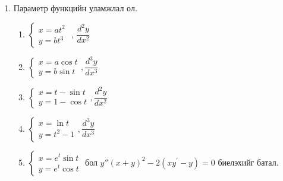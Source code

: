 \begin{enumerate}
\begin{enumerate}
    \item $e^{x+y}-xy=0$ , $y''$
\end{enumerate}
\item Параметр функцийн уламжлал ол.
\begin{enumerate}
    \item
    $\begin{cases}
        x=at^2\\
        y=bt^3
    \end{cases}$ , $\dfrac{d^2y}{dx^2}$
      \item 
     $ \begin{cases}
        x=a\cos t\\
        y=b\sin t
    \end{cases} , \dfrac{d^3y}{dx^3}$
      \item 
      $\begin{cases}
        x=t-\sin t\\
        y=1-\cos t
    \end{cases} , \dfrac{d^2y}{dx^2}$
      \item 
      $\begin{cases}
        x=\ln t\\
        y=t^2-1
    \end{cases} , \dfrac{d^3y}{dx^3}$  
    \item 
    $\begin{cases}
        x=e^t\sin t\\
        y=e^t\cos t
    \end{cases}$ бол $y''(x+y)^2-2(xy^{\prime}-y)=0$ биелэхийг батал.
\end{enumerate}
\end{enumerate}
\newpage
